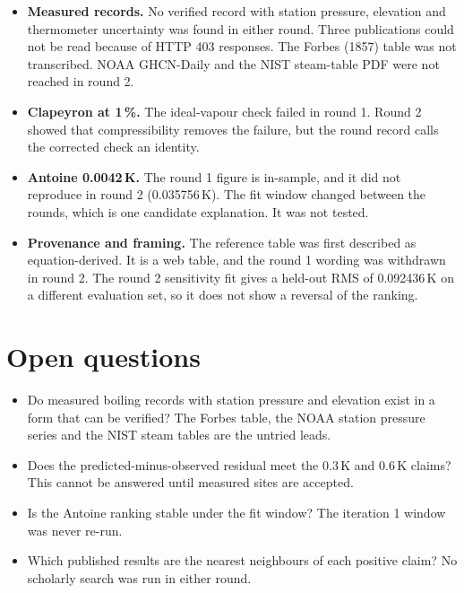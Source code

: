 \documentclass[11pt,letterpaper]{article}
\begin{document}
\begin{itemize}
\item \textbf{Measured records.} No verified record with station pressure, elevation and thermometer uncertainty was found in either round. Three publications could not be read because of HTTP 403 responses. The Forbes (1857) table was not transcribed. NOAA GHCN-Daily and the NIST steam-table PDF were not reached in round 2.
\item \textbf{Clapeyron at 1\,\%.} The ideal-vapour check failed in round 1. Round 2 showed that compressibility removes the failure, but the round record calls the corrected check an identity.
\item \textbf{Antoine 0.0042\,K.} The round 1 figure is in-sample, and it did not reproduce in round 2 (0.035756\,K). The fit window changed between the rounds, which is one candidate explanation. It was not tested.
\item \textbf{Provenance and framing.} The reference table was first described as equation-derived. It is a web table, and the round 1 wording was withdrawn in round 2. The round 2 sensitivity fit gives a held-out RMS of 0.092436\,K on a different evaluation set, so it does not show a reversal of the ranking.
\end{itemize}

\section{Open questions}

\begin{itemize}
\item Do measured boiling records with station pressure and elevation exist in a form that can be verified? The Forbes table, the NOAA station pressure series and the NIST steam tables are the untried leads.
\item Does the predicted-minus-observed residual meet the 0.3\,K and 0.6\,K claims? This cannot be answered until measured sites are accepted.
\item Is the Antoine ranking stable under the fit window? The iteration 1 window was never re-run.
\item Which published results are the nearest neighbours of each positive claim? No scholarly search was run in either round.
\end{itemize}
\end{document}
